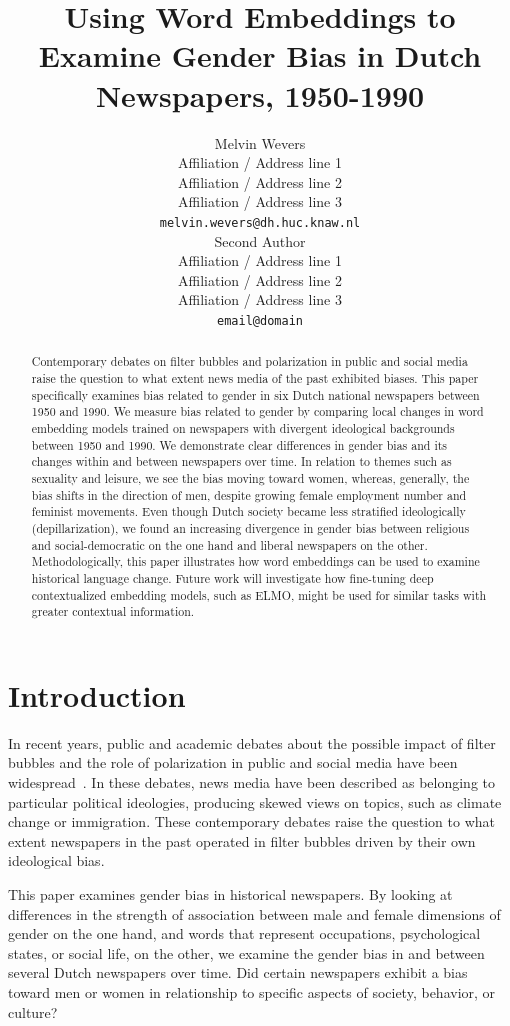 \documentclass[11pt,a4paper]{article}
\title{Using Word Embeddings to Examine Gender Bias in Dutch Newspapers, 1950-1990}
\author{Melvin Wevers \\
  Affiliation / Address line 1 \\
  Affiliation / Address line 2 \\
  Affiliation / Address line 3 \\
  \texttt{melvin.wevers@dh.huc.knaw.nl} \\\And
  Second Author \\
  Affiliation / Address line 1 \\
  Affiliation / Address line 2 \\
  Affiliation / Address line 3 \\
  \texttt{email@domain} \\}
\date{}
\begin{document}
\maketitle
\begin{abstract}
Contemporary debates on filter bubbles and polarization in public and social media raise the question to what extent news media of the past exhibited biases. This paper specifically examines bias related to gender in six Dutch national newspapers between 1950 and 1990. We measure bias related to gender by comparing local changes in word embedding models trained on newspapers with divergent ideological backgrounds between 1950 and 1990.
We demonstrate clear differences in gender bias and its changes within and between newspapers over time. In relation to themes such as sexuality and leisure, we see the bias moving toward women, whereas, generally, the bias shifts in the direction of men, despite growing female employment number and feminist movements. Even though Dutch society became less stratified ideologically (depillarization), we found an increasing divergence in gender bias between religious and social-democratic on the one hand and liberal newspapers on the other.
Methodologically, this paper illustrates how word embeddings can be used to examine historical language change. Future work will investigate how fine-tuning deep contextualized embedding models, such as ELMO, might be used for similar tasks with greater contextual information.
\end{abstract}

\section{Introduction}
In recent years, public and academic debates about the possible impact of filter bubbles and the role of polarization in public and social media have been widespread~\cite{pariser2011filter, flaxman2016filter}. In these debates, news media have been described as belonging to particular political ideologies, producing skewed views on topics, such as climate change or immigration. These contemporary debates raise the question to what extent newspapers in the past operated in filter bubbles driven by their own ideological bias.

This paper examines gender bias in historical newspapers. By looking at differences in the strength of association between male and female dimensions of gender on the one hand, and words that represent occupations, psychological states, or social life, on the other, we examine the gender bias in and between several Dutch newspapers over time. Did certain newspapers exhibit a bias toward men or women in relationship to specific aspects of society, behavior, or culture?
\end{document}
